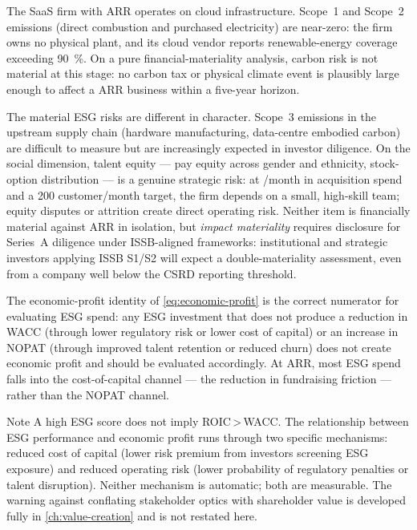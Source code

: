 \begin{example}
The SaaS firm with  ARR operates on cloud infrastructure. Scope~1 and
Scope~2 emissions (direct combustion and purchased electricity) are near-zero: the firm
owns no physical plant, and its cloud vendor reports renewable-energy coverage exceeding
\qty{90}{\percent}. On a pure financial-materiality analysis, carbon risk is not material
at this stage: no carbon tax or physical climate event is plausibly large enough to affect
a  ARR business within a five-year horizon.

The material ESG risks are different in character. Scope~3 emissions in the upstream supply
chain (hardware manufacturing, data-centre embodied carbon) are difficult to measure but
are increasingly expected in investor diligence. On the social dimension, talent equity —
pay equity across gender and ethnicity, stock-option distribution — is a genuine strategic
risk: at /month in acquisition spend and a 200 customer/month target, the
firm depends on a small, high-skill team; equity disputes or attrition create direct
operating risk. Neither item is financially material against  ARR in
isolation, but \emph{impact materiality} requires disclosure for Series~A diligence under
ISSB-aligned frameworks: institutional and strategic investors applying ISSB S1/S2 will
expect a double-materiality assessment, even from a company well below the CSRD reporting
threshold.

The economic-profit identity of \cref{eq:economic-profit} is the correct numerator for
evaluating ESG spend: any ESG investment that does not produce a reduction in WACC
(through lower regulatory risk or lower cost of capital) or an increase in NOPAT (through
improved talent retention or reduced churn) does not create economic profit and should be
evaluated accordingly. At  ARR, most ESG spend falls into the
cost-of-capital channel — the reduction in fundraising friction — rather than the NOPAT
channel.
\end{example}

\begin{admonition}{Note}
A high ESG score does not imply ROIC\,>\,WACC. The relationship between ESG performance
and economic profit runs through two specific mechanisms: reduced cost of capital (lower
risk premium from investors screening ESG exposure) and reduced operating risk (lower
probability of regulatory penalties or talent disruption). Neither mechanism is automatic;
both are measurable. The warning against conflating stakeholder optics with shareholder
value is developed fully in \cref{ch:value-creation} and is not restated here.
\end{admonition}

